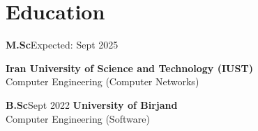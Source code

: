 	\section{Education}

\begin{threecolentry}{\textbf{M.Sc}}{Expected: Sept 2025}
	
	\textbf{Iran University of Science and Technology (IUST)}\\
	Computer Engineering (Computer Networks) \\
	
\end{threecolentry}

\begin{threecolentry}{\textbf{B.Sc}}{Sept 2022}
	\textbf{University of Birjand} \\
	Computer Engineering (Software)\\
	
\end{threecolentry}

